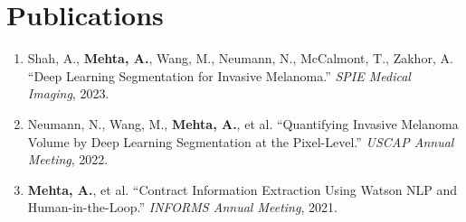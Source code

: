 \documentclass[10pt]{article}
\begin{document}
\section*{Publications}
\begin{enumerate}[leftmargin=1.4em,itemsep=1pt,topsep=1pt]
\item Shah, A., \textbf{Mehta, A.}, Wang, M., Neumann, N., McCalmont, T., Zakhor, A. ``Deep Learning Segmentation for Invasive Melanoma.'' \textit{SPIE Medical Imaging}, 2023.
\item Neumann, N., Wang, M., \textbf{Mehta, A.}, et al. ``Quantifying Invasive Melanoma Volume by Deep Learning Segmentation at the Pixel-Level.'' \textit{USCAP Annual Meeting}, 2022.
\item \textbf{Mehta, A.}, et al. ``Contract Information Extraction Using Watson NLP and Human-in-the-Loop.'' \textit{INFORMS Annual Meeting}, 2021.
\end{enumerate}
\end{document}
